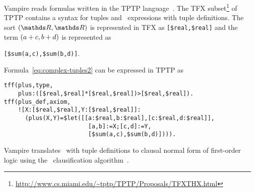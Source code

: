 Vampire reads formulas written in the TPTP language~\cite{tff0}. The TFX subset\footnote{\url{http://www.cs.miami.edu/~tptp/TPTP/Proposals/TFXTHX.html}} of TPTP contains a syntax for tuples and \LETIN\ expressions with tuple definitions. The sort $(\R,\R)$ is represented in TFX as \lstinline'[$real,$real]' and the term $({a+c,b+d})$ is represented as \begin{center}\lstinline'[$sum(a,c),$sum(b,d)]'.\end{center}Formula~\ref{eq:complex-tuples2} can be expressed in TPTP as
\begin{lstlisting}[language=tptp]
tff(plus,type,
    plus:([$real,$real]*[$real,$real])>[$real,$real]).
tff(plus_def,axiom,
    ![X:[$real,$real],Y:[$real,$real]]:
      (plus(X,Y)=$let([[a:$real,b:$real],[c:$real,d:$real]],
                        [a,b]:=X;[c,d]:=Y,
                        [$sum(a,c),$sum(b,d)]))).
\end{lstlisting}

Vampire translates \LETIN\ with tuple definitions to clausal normal form of first-order logic using the \newcnf\ clausification algorithm~\cite{FOOLCNF}.
